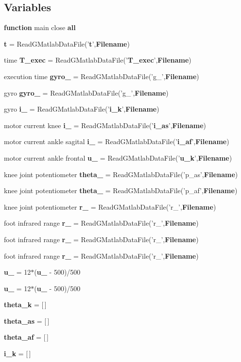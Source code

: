 \subsection*{Variables}
\begin{DoxyCompactItemize}
\item 
{\bf function} main close {\bf all}
\item 
{\bf t} = ReadGMatlabDataFile('{\bf t}',{\bf Filename})
\item 
time {\bf T\_\-exec} = ReadGMatlabDataFile('{\bf T\_\-exec}',{\bf Filename})
\item 
execution time {\bf gyro\_} = ReadGMatlabDataFile('g\_',{\bf Filename})
\item 
gyro {\bf gyro\_} = ReadGMatlabDataFile('g\_',{\bf Filename})
\item 
gyro {\bf i\_} = ReadGMatlabDataFile('{\bf i\_\-k}',{\bf Filename})
\item 
motor current knee {\bf i\_} = ReadGMatlabDataFile('{\bf i\_\-as}',{\bf Filename})
\item 
motor current ankle sagital {\bf i\_} = ReadGMatlabDataFile('{\bf i\_\-af}',{\bf Filename})
\item 
motor current ankle frontal {\bf u\_} = ReadGMatlabDataFile('{\bf u\_\-k}',{\bf Filename})
\item 
knee joint potentiometer {\bf theta\_} = ReadGMatlabDataFile('p\_\-as',{\bf Filename})
\item 
knee joint potentiometer {\bf theta\_} = ReadGMatlabDataFile('p\_\-af',{\bf Filename})
\item 
knee joint potentiometer {\bf r\_} = ReadGMatlabDataFile('r\_',{\bf Filename})
\item 
foot infrared range {\bf r\_} = ReadGMatlabDataFile('r\_',{\bf Filename})
\item 
foot infrared range {\bf r\_} = ReadGMatlabDataFile('r\_',{\bf Filename})
\item 
foot infrared range {\bf r\_} = ReadGMatlabDataFile('r\_',{\bf Filename})
\item 
{\bf u\_} = 12$\ast$({\bf u\_} -\/ 500)/500
\item 
{\bf u\_} = 12$\ast$({\bf u\_} -\/ 500)/500
\item 
{\bf theta\_\-k} = [$\,$]
\item 
{\bf theta\_\-as} = [$\,$]
\item 
{\bf theta\_\-af} = [$\,$]
\item 
{\bf i\_\-k} = [$\,$]

\end{DoxyCompactItemize}
